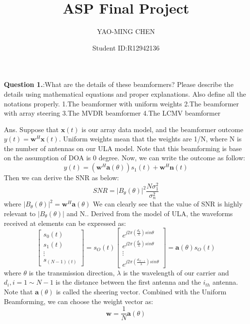 \documentclass[11pt]{article}
\title{ASP Final Project}
\author{YAO-MING CHEN}
\date{Student ID:R12942136}
\begin{document}
\maketitle

\thispagestyle{fancyplain}
\renewcommand{\footrulewidth}{0.4pt}

\begin{mdframed}[backgroundcolor=lightshadecolor, linewidth=0pt, innertopmargin=12pt, innerbottommargin=12pt]
{\bf Question 1.}:What are the details of these beamformers? Please describe the details using
mathematical equations and proper explanations. Also define all the notations properly.\newline
1.The beamformer with uniform weights\newline
2.The beamformer with array steering\newline
3.The MVDR beamformer\newline
4.The LCMV beamformer
\end{mdframed}
Ans.\newline
Suppose that $\textbf{x}(t)$ is our array data model, and the beamformer outcome $y(t) = \textbf{w}^H\textbf{x}(t)$. Uniform weights mean that the weights are 1/N, where N is the number of antennas on our ULA model.\newline
Note that this beamforming is base on the assumption of DOA is 0 degree.\newline
Now, we can write the outcome as follow:
$$y(t) = (\textbf{w}^H \textbf{a}(\theta)) s_1(t) + \textbf{w}^H \textbf{n}(t)$$
Then we can derive the SNR as below:
$$SNR = |B_\theta(\theta)|^2 \frac{N\sigma_1^2}{\sigma_n^2}$$
where $|B_\theta(\theta)|^2 = \textbf{w}^H \textbf{a}(\theta)$\newline
We can clearly see that the value of SNR is highly relevant to $|B_\theta(\theta)|$ and N.. Derived from the model of ULA, the waveforms received at elements can be expressed as:
$$\begin{bmatrix} s_0(t) \\ s_1(t) \\ \vdots \\ s_{(N-1)(t)}\end{bmatrix} = 
s_O(t) \begin{bmatrix} e^{j2\pi(\frac{d_0}{\lambda})sin\theta} \\ e^{j2\pi(\frac{d_1}{\lambda})sin\theta} \\ \vdots \\  e^{j2\pi(\frac{d_{N-1}}{\lambda})sin\theta} \end{bmatrix} = \textbf{a}(\theta) s_O(t)$$
where $\theta$ is the transmission direction, $\lambda$ is the wavelength of our carrier and $d_i, i = 1 \sim N-1$ is the distance between the first antenna and the $i_{th}$ antenna.\newline
Note that $\textbf{a}(\theta)$ is called the sheering vector.\newline
Combined with the Uniform Beamforming, we can choose the weight vector as:
$$\textbf{w} = \frac{1}{N} \textbf{a}(\theta)$$
\end{document}
